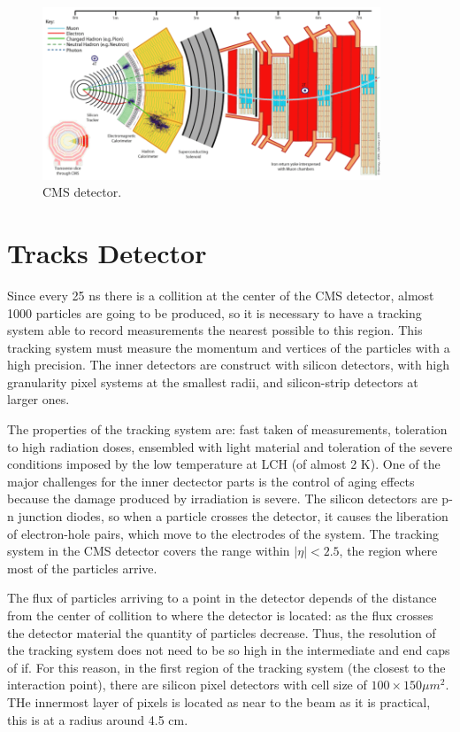  \begin{figure}[h] \label{CMS_detector}
 \centering
 \caption{CMS detector.}
 \includegraphics[width=0.9\textwidth]{./Capitulos/CMS/CMS}  
 \end{figure}

\section{Tracks Detector}

Since every 25 ns there is a collition at the center of the CMS detector, almost 1000 particles are going to be produced, so it is necessary to have a tracking system able to record measurements the nearest possible to this region. This tracking system must measure the momentum and vertices of the particles with a high precision. The inner detectors are construct with silicon detectors, with high granularity pixel systems at the smallest radii, and silicon-strip detectors at larger ones. 

The properties of the tracking system are: fast taken of measurements, toleration to high radiation doses, ensembled with light material and toleration of the severe conditions imposed by the low temperature at LCH (of almost 2 K). One of the major challenges for the inner dectector parts is the control of aging effects because the damage produced by irradiation is severe. The silicon detectors are p-n junction diodes, so when a particle crosses the detector, it causes the liberation of electron-hole pairs, which move to the electrodes of the system. The tracking system in the CMS detector covers the range within $|\eta|<2.5$, the region where most of the particles arrive. 

The flux of particles arriving to a point in the detector depends of the distance from the center of collition to where the detector is located: as the flux crosses the detector material the quantity of particles decrease. Thus, the resolution of the tracking system does not need to be so high in the intermediate and end caps of if. For this reason, in the first region of the tracking system (the closest to the interaction point), there are silicon pixel detectors with cell size of $100 \times 150 \mu m^2$. THe innermost layer of pixels is located as near to the beam as it is practical, this is at a radius around 4.5 cm.
 
